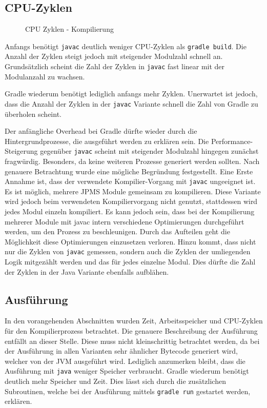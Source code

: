 \subsection {CPU-Zyklen}

\begin{figure} [t!]
	
	\caption{CPU Zyklen - Kompilierung}
\end{figure}

Anfangs benötigt \texttt{javac} deutlich weniger CPU-Zyklen als \texttt{gradle build}.
Die Anzahl der Zyklen steigt jedoch mit steigender Modulzahl schnell an.
Grundsätzlich scheint die Zahl der Zyklen in \texttt{javac} fast linear mit der Modulanzahl zu wachsen.

Gradle wiederum benötigt lediglich anfangs mehr Zyklen.
Unerwartet ist jedoch, dass die Anzahl der Zyklen in der \texttt{javac} Variante schnell die Zahl von Gradle zu überholen scheint.

Der anfängliche Overhead bei Gradle dürfte wieder durch die Hintergrundprozesse, die ausgeführt werden zu erklären sein.
Die Performance-Steigerung gegenüber \texttt{javac} scheint mit steigender Modulzahl hingegen zunächst fragwürdig. Besonders, da keine weiteren Prozesse generiert werden sollten.
Nach genauere Betrachtung wurde eine mögliche Begründung festgestellt.
Eine Erste Annahme ist, dass der verwendete Kompilier-Vorgang mit \texttt{javac} ungeeignet ist. 
Es ist möglich, mehrere JPMS Module gemeinsam zu kompilieren. 
Diese Variante wird jedoch beim verwendeten Kompiliervorgang nicht genutzt, stattdessen wird jedes Modul einzeln kompiliert.
Es kann jedoch sein, dass bei der Kompilierung mehrerer Module mit javac intern verschiedene Optimierungen durchgeführt werden, um den Prozess zu beschleunigen. 
Durch das Aufteilen geht die Möglichkeit diese Optimierungen einzusetzen verloren. 
Hinzu kommt, dass nicht nur die Zyklen von \texttt{javac} gemessen, sondern auch die Zyklen der umliegenden Logik mitgezählt werden und das für jedes einzelne Modul. 
Dies dürfte die Zahl der Zyklen in der Java Variante ebenfalls aufblähen.


\subsection{Ausführung}
In den vorangehenden Abschnitten wurden Zeit, Arbeitsspeicher und CPU-Zyklen für den Kompilierprozess betrachtet.
Die genauere Beschreibung der Ausführung entfällt an dieser Stelle.
Diese muss nicht kleinschrittig betrachtet werden, da bei der Ausführung in allen Varianten sehr ähnlicher Bytecode generiert wird, welcher von der JVM ausgeführt wird.
Lediglich anzumerken bleibt, dass die Ausführung mit \texttt{java} weniger Speicher verbraucht. 
Gradle wiederum benötigt deutlich mehr Speicher und Zeit.
Dies lässt sich durch die zusätzlichen Subroutinen, welche bei der Ausführung mittels \texttt{gradle run} gestartet werden, erklären.


